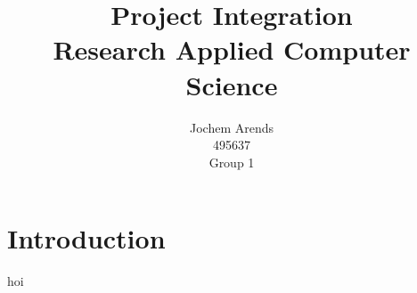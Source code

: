 \documentclass{article}
\title{Project Integration \\ Research Applied Computer Science}
\author{Jochem Arends \\ 495637 \\ Group 1}
\begin{document}
\maketitle
\newpage

\tableofcontents
\newpage

\section{Introduction}
hoi \cite{test}


\newpage

\end{document}
